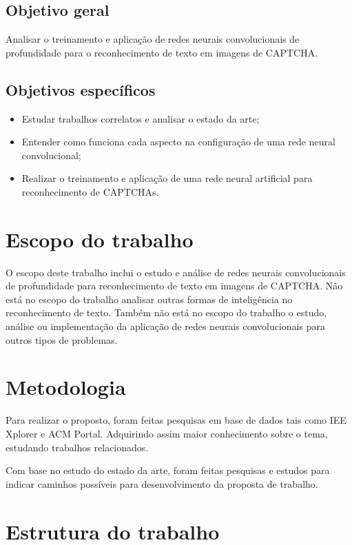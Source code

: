 \subsection{Objetivo geral}

Analisar o treinamento e aplicação de redes neurais convolucionais de
profundidade para o reconhecimento de texto em imagens de CAPTCHA.

\subsection{Objetivos específicos}

\begin{itemize}
        \item Estudar trabalhos correlatos e analisar o estado da arte;
	\item Entender como funciona cada aspecto na configuração de
          uma rede neural convolucional;
	\item Realizar o treinamento e aplicação de uma rede neural
          artificial para reconhecimento de CAPTCHAs.
\end{itemize}

\section{Escopo do trabalho}

O escopo deste trabalho inclui o estudo e análise de redes neurais  
convolucionais de profundidade para reconhecimento de texto em imagens de  
CAPTCHA. Não está no escopo do trabalho analisar outras formas de
inteligência no reconhecimento de texto. Também não está no escopo do
trabalho o estudo, análise ou implementação da aplicação de redes
neurais convolucionais para outros tipos de problemas.

\section{Metodologia}

Para realizar o proposto, foram feitas pesquisas em base de dados tais
como IEE Xplorer e ACM Portal. Adquirindo assim maior conhecimento
sobre o tema, estudando trabalhos relacionados. 

Com base no estudo do estado da arte, foram feitas pesquisas e
estudos para indicar caminhos possíveis para desenvolvimento da
proposta de trabalho.

\section{Estrutura do trabalho}

